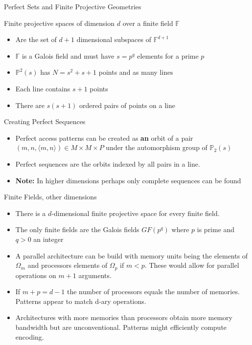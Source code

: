 \documentclass{beamer}
\begin{document}
\begin{frame}{Perfect Sets and Finite Projective Geometries}
\begin{block}{Finite projective spaces of dimension $d$ over a finite field $\mathbb{F}$}
  \begin{itemize}
  \item Are the set of $d+1$ dimensional subspaces of $\mathbb{F}^{d+1}$
  \item $\mathbb{F}$ is a Galois field and must have $s = p^q$ elements for a prime $p$
  \item $\mathbb{P}^2(s)$ has $N=s^2+s+1$ points and as many lines
  \item Each line contains $s+1$ points
  \item There are $s(s+1)$ ordered pairs of points on a line
  \end{itemize}
  \end{block}

\begin{block}{Creating Perfect Sequences}
\begin{itemize}
\item Perfect access patterns can be created as {\bf an} orbit of a pair $(m,n,\langle m,n \rangle) \in M \times M \times P$ under the automorphism group of $\mathbb{P}_2(s)$
\item Perfect sequences are the orbits indexed by all pairs in a line.
\item {\bf Note:} In higher dimensions perhaps only complete sequences can be found
\end{itemize}
\end{block}
\end{frame}



\begin{frame}{Finite Fields, other dimensions}

\begin{itemize}
\item There is a $d$-dimensional finite projective space for every finite field.
\item The only finite fields are the Galois fields $GF(p^q)$ where $p$ is prime and $q>0$ an integer
\item A parallel architecture can be build with memory units being the elements of $\Omega_m$ and processors elements of $\Omega_p$ if $m<p$. These would allow for parallel operations on $m+1$ arguments.
\item If $m+p = d-1$ the number of processors equals the number of memories.  Patterns appear to match d-ary operations.  
\item Architectures with more memories than processors obtain more memory bandwidth but are unconventional.  Patterns might efficiently compute encoding.
\end{itemize}
\end{frame}
\end{document}

